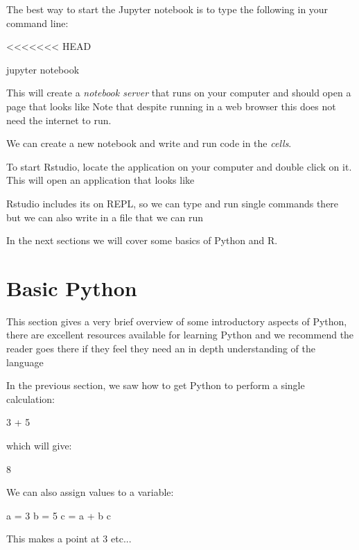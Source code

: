 The best way to start the Jupyter notebook is to type the following in your
command line:

<<<<<<< HEAD
\begin{cliin}
jupyter notebook
\end{cliin}

This will create a \textit{notebook server} that runs on your computer and
should open a page that looks like %
Note that despite running in a web browser this does not need the internet to
run.

We can create a new notebook and write and run code in the \textit{cells}.

To start Rstudio, locate the application on your computer and double click on
it. This will open an application that looks like %

Rstudio includes its on REPL, so we can type and run single commands there but
we can also write in a file that we can run

In the next sections we will cover some basics of Python and R.

\section{Basic Python}\label{sec:basic-python}

This section gives a very brief overview of some introductory aspects of Python,
there are excellent resources available for learning Python and we recommend the
reader goes there if they feel they need an in depth understanding of the
language %

In the previous section, we saw how to get Python to perform a single
calculation:

\begin{pyin}
3 + 5
\end{pyin}

which will give:

\begin{pyout}
8
\end{pyout}

We can also assign values to a variable:

\begin{pyin}
a = 3
b = 5
c = a + b
c
\end{pyin}

\begin{explanation}
This makes a point at 3 etc...  %
\end{explanation}

